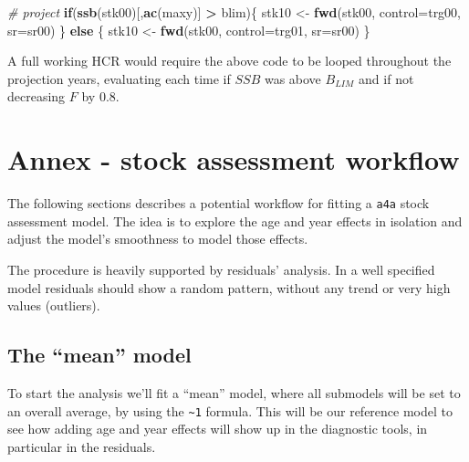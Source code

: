 \documentclass[
]{book}
\newenvironment{Shaded}{\begin{snugshade}}{\end{snugshade}}
\newcommand{\AttributeTok}[1]{\textcolor[rgb]{0.13,0.29,0.53}{#1}}
\newcommand{\CommentTok}[1]{\textcolor[rgb]{0.56,0.35,0.01}{\textit{#1}}}
\newcommand{\ControlFlowTok}[1]{\textcolor[rgb]{0.13,0.29,0.53}{\textbf{#1}}}
\newcommand{\FunctionTok}[1]{\textcolor[rgb]{0.13,0.29,0.53}{\textbf{#1}}}
\newcommand{\NormalTok}[1]{#1}
\newcommand{\OtherTok}[1]{\textcolor[rgb]{0.56,0.35,0.01}{#1}}
\newcommand{\SpecialCharTok}[1]{\textcolor[rgb]{0.81,0.36,0.00}{\textbf{#1}}}
\begin{document}
\begin{Shaded}
\begin{Highlighting}[]
\CommentTok{\# project}
\ControlFlowTok{if}\NormalTok{(}\FunctionTok{ssb}\NormalTok{(stk00)[,}\FunctionTok{ac}\NormalTok{(maxy)] }\SpecialCharTok{\textgreater{}}\NormalTok{ blim)\{}
\NormalTok{        stk10 }\OtherTok{\textless{}{-}} \FunctionTok{fwd}\NormalTok{(stk00, }\AttributeTok{control=}\NormalTok{trg00, }\AttributeTok{sr=}\NormalTok{sr00)}
\NormalTok{    \} }\ControlFlowTok{else}\NormalTok{ \{}
\NormalTok{        stk10 }\OtherTok{\textless{}{-}} \FunctionTok{fwd}\NormalTok{(stk00, }\AttributeTok{control=}\NormalTok{trg01, }\AttributeTok{sr=}\NormalTok{sr00)}
\NormalTok{\}}
\end{Highlighting}
\end{Shaded}

A full working HCR would require the above code to be looped throughout the projection years, evaluating each time if \(SSB\) was above \(B_{LIM}\) and if not decreasing \(F\) by 0.8.

\hypertarget{annex---stock-assessment-workflow}{%
\chapter{Annex - stock assessment workflow}\label{annex---stock-assessment-workflow}}

The following sections describes a potential workflow for fitting a \texttt{a4a} stock assessment model. The idea is to explore the age and year effects in isolation and adjust the model's smoothness to model those effects.

The procedure is heavily supported by residuals' analysis. In a well specified model residuals should show a random pattern, without any trend or very high values (outliers).

\hypertarget{the-mean-model}{%
\section{The ``mean'' model}\label{the-mean-model}}

To start the analysis we'll fit a ``mean'' model, where all submodels will be set to an overall average, by using the \texttt{\textasciitilde{}1} formula. This will be our reference model to see how adding age and year effects will show up in the diagnostic tools, in particular in the residuals.
\end{document}
